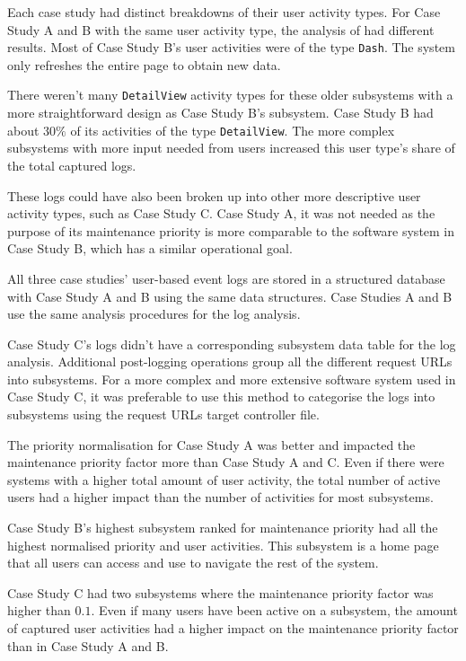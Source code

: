 Each case study had distinct breakdowns of their user activity types. For Case Study A and B with the same user activity type, the analysis of  had different results. Most of Case Study B's user activities were of the type \texttt{Dash}.  The system only refreshes the entire page to obtain new data. \par There weren't many \texttt{DetailView} activity types for these older subsystems with a more straightforward design as Case Study B's subsystem. Case Study B had about $30\%$ of its activities of the type \texttt{DetailView}. The more complex subsystems with more input needed from users increased this user type's share of the total captured logs.\par These logs could have also been broken up into other more descriptive user activity types, such as Case Study C. Case Study A, it was not needed as the purpose of its maintenance priority is more comparable to the software system in Case Study B, which has a similar operational goal.\par All three case studies' user-based event logs are stored in a structured database with Case Study A and B using the same data structures. Case Studies A and B use the same analysis procedures for the log analysis. \par Case Study C's logs didn't have a corresponding subsystem data table for the log analysis. Additional post-logging operations group all the different request URLs into subsystems. For a more complex and more extensive software system used in Case Study C, it was preferable to use this method to categorise the logs into subsystems using the request URLs target controller file.\par The priority normalisation for Case Study A was better and impacted the maintenance priority factor more than Case Study A and C. Even if there were systems with a higher total amount of user activity, the total number of active users had a higher impact than the number of activities for most subsystems. \par Case Study B's highest subsystem ranked for maintenance priority had all the highest normalised priority and user activities. This subsystem is a home page that all users can access and use to navigate the rest of the system. \par Case Study C had two subsystems where the maintenance priority factor was higher than $0.1$. Even if many users have been active on a subsystem, the amount of captured user activities had a higher impact on the maintenance priority factor than in Case Study A and B.

